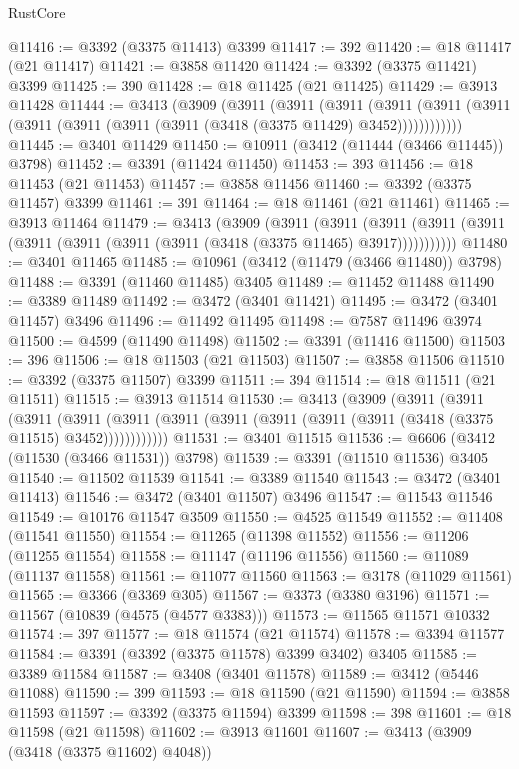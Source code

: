 \begin{lexlean}{RustCore}
\begin{coremodule}
@11416 := @3392 (@3375 @11413) @3399
@11417 := 392
@11420 := @18 @11417 (@21 @11417)
@11421 := @3858 @11420
@11424 := @3392 (@3375 @11421) @3399
@11425 := 390
@11428 := @18 @11425 (@21 @11425)
@11429 := @3913 @11428
@11444 := @3413
    (@3909
      (@3911
        (@3911
          (@3911
            (@3911 (@3911 (@3911 (@3911 (@3911 (@3911 (@3911 (@3418 (@3375 @11429) @3452))))))))))))
@11445 := @3401 @11429
@11450 := @10911 (@3412 (@11444 (@3466 @11445)) @3798)
@11452 := @3391 (@11424 @11450)
@11453 := 393
@11456 := @18 @11453 (@21 @11453)
@11457 := @3858 @11456
@11460 := @3392 (@3375 @11457) @3399
@11461 := 391
@11464 := @18 @11461 (@21 @11461)
@11465 := @3913 @11464
@11479 := @3413
    (@3909
      (@3911
        (@3911
          (@3911 (@3911 (@3911 (@3911 (@3911 (@3911 (@3911 (@3418 (@3375 @11465) @3917)))))))))))
@11480 := @3401 @11465
@11485 := @10961 (@3412 (@11479 (@3466 @11480)) @3798)
@11488 := @3391 (@11460 @11485) @3405
@11489 := @11452 @11488
@11490 := @3389 @11489
@11492 := @3472 (@3401 @11421)
@11495 := @3472 (@3401 @11457) @3496
@11496 := @11492 @11495
@11498 := @7587 @11496 @3974
@11500 := @4599 (@11490 @11498)
@11502 := @3391 (@11416 @11500)
@11503 := 396
@11506 := @18 @11503 (@21 @11503)
@11507 := @3858 @11506
@11510 := @3392 (@3375 @11507) @3399
@11511 := 394
@11514 := @18 @11511 (@21 @11511)
@11515 := @3913 @11514
@11530 := @3413
    (@3909
      (@3911
        (@3911
          (@3911
            (@3911 (@3911 (@3911 (@3911 (@3911 (@3911 (@3911 (@3418 (@3375 @11515) @3452))))))))))))
@11531 := @3401 @11515
@11536 := @6606 (@3412 (@11530 (@3466 @11531)) @3798)
@11539 := @3391 (@11510 @11536) @3405
@11540 := @11502 @11539
@11541 := @3389 @11540
@11543 := @3472 (@3401 @11413)
@11546 := @3472 (@3401 @11507) @3496
@11547 := @11543 @11546
@11549 := @10176 @11547 @3509
@11550 := @4525 @11549
@11552 := @11408 (@11541 @11550)
@11554 := @11265 (@11398 @11552)
@11556 := @11206 (@11255 @11554)
@11558 := @11147 (@11196 @11556)
@11560 := @11089 (@11137 @11558)
@11561 := @11077 @11560
@11563 := @3178 (@11029 @11561)
@11565 := @3366 (@3369 @305)
@11567 := @3373 (@3380 @3196)
@11571 := @11567 (@10839 (@4575 (@4577 @3383)))
@11573 := @11565 @11571 @10332
@11574 := 397
@11577 := @18 @11574 (@21 @11574)
@11578 := @3394 @11577
@11584 := @3391 (@3392 (@3375 @11578) @3399 @3402) @3405
@11585 := @3389 @11584
@11587 := @3408 (@3401 @11578)
@11589 := @3412 (@5446 @11088)
@11590 := 399
@11593 := @18 @11590 (@21 @11590)
@11594 := @3858 @11593
@11597 := @3392 (@3375 @11594) @3399
@11598 := 398
@11601 := @18 @11598 (@21 @11598)
@11602 := @3913 @11601
@11607 := @3413 (@3909 (@3418 (@3375 @11602) @4048))

\end{coremodule}
\end{lexlean}
